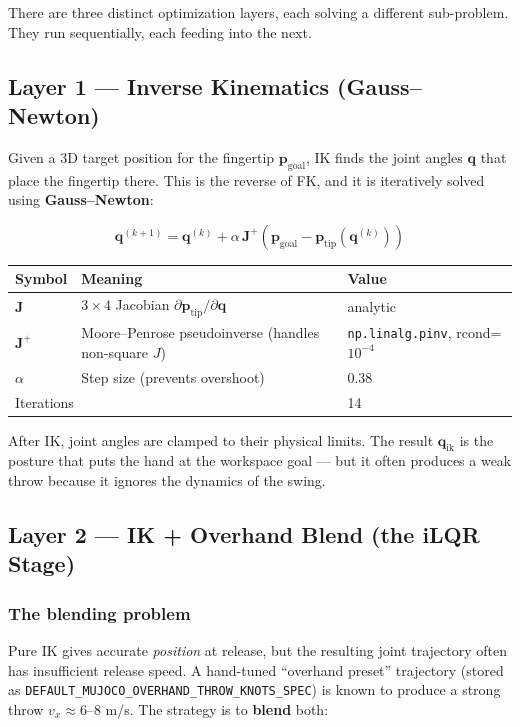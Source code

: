 \documentclass[11pt,letterpaper]{article}
\newcommand{\bq}{\bm{q}}
\begin{document}
There are three distinct optimization layers, each solving a different sub-problem. They run sequentially, each feeding into the next.

\subsection{Layer 1 — Inverse Kinematics (Gauss–Newton)}

Given a 3D target position for the fingertip $\bm{p}_{\text{goal}}$, IK finds the joint angles $\bq$ that place the fingertip there. This is the reverse of FK, and it is iteratively solved using \textbf{Gauss–Newton}:

\begin{equation}
  \bq^{(k+1)} = \bq^{(k)} + \alpha\, \mathbf{J}^+\!\left(\bm{p}_{\text{goal}} - \bm{p}_{\text{tip}}(\bq^{(k)})\right)
  \label{eq:ik}
\end{equation}

\begin{center}
\begin{tabular}{lll}
\toprule
Symbol & Meaning & Value \\
\midrule
$\mathbf{J}$ & $3 \times 4$ Jacobian $\partial\bm{p}_{\text{tip}}/\partial\bq$ & analytic \\
$\mathbf{J}^+$ & Moore–Penrose pseudoinverse (handles non-square $J$) & \texttt{np.linalg.pinv}, rcond=$10^{-4}$ \\
$\alpha$ & Step size (prevents overshoot) & 0.38 \\
\multicolumn{2}{l}{Iterations} & 14 \\
\bottomrule
\end{tabular}
\end{center}

After IK, joint angles are clamped to their physical limits. The result $\bq_{\text{ik}}$ is the posture that puts the hand at the workspace goal — but it often produces a weak throw because it ignores the dynamics of the swing.

\subsection{Layer 2 — IK + Overhand Blend (the iLQR Stage)}

\subsubsection{The blending problem}
Pure IK gives accurate \emph{position} at release, but the resulting joint trajectory often has insufficient release speed. A hand-tuned ``overhand preset'' trajectory (stored as \texttt{DEFAULT\_MUJOCO\_OVERHAND\_THROW\_KNOTS\_SPEC}) is known to produce a strong throw $v_x \approx 6$--$8$ m/s. The strategy is to \textbf{blend} both:
\end{document}
